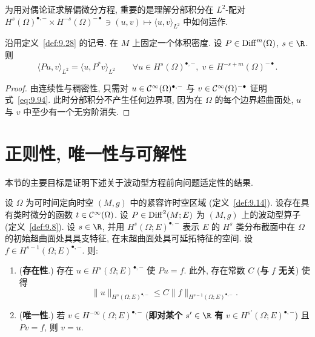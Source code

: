 为用对偶论证求解偏微分方程, 重要的是理解分部积分在 $L^2$-配对 $H^s(\Omega)^{\bullet,-} \times H^{-s}(\Omega)^{-\bullet} \ni (u, v) \mapsto \langle u, v \rangle_{L^2}$ 中如何运作.

\begin{lemma}[分部积分]\label{lem:9.32}
沿用定义~\ref{def:9.28} 的记号. 在 $M$ 上固定一个体积密度. 设 $P \in \operatorname{Diff}^m(\Omega)$, $s \in \R$. 则
\begin{equation}\label{eq:9.94}
    \langle P u, v \rangle_{L^2} = \langle u, P^* v \rangle_{L^2} \qquad \forall u \in H^s(\Omega)^{\bullet,-}, \; v \in H^{-s+m}(\Omega)^{-\bullet}.
\end{equation}
\end{lemma}

\begin{proof}
由连续性与稠密性, 只需对 $u \in \mathcal{C}^\infty(\Omega)^{\bullet,-}$ 与 $v \in \mathcal{C}^\infty(\Omega)^{-\bullet}$ 证明式~\eqref{eq:9.94}. 此时分部积分不产生任何边界项, 因为在 $\Omega$ 的每个边界超曲面处, $u$ 与 $v$ 中至少有一个无穷阶消失.
\end{proof}

\section{正则性, 唯一性与可解性}\label{sec:9.4}
%
%

本节的主要目标是证明下述关于波动型方程前向问题适定性的结果.

\begin{theorem}[求解波动型方程]\label{thm:9.33}
设 $\Omega$ 为可时间定向时空 $(M, g)$ 中的紧容许时空区域 (定义~\ref{def:9.14}). 设存在具有类时微分的函数 $t \in \mathcal{C}^\infty(\Omega)$. 设 $P \in \operatorname{Diff}^2(M; E)$ 为 $(M, g)$ 上的波动型算子 (定义~\ref{def:9.8}). 设 $s \in \R$, 并用 $H^s(\Omega; E)^{\bullet,-}$ 表示 $E$ 的 $H^s$ 类分布截面中在 $\Omega$ 的初始超曲面处具具支特征, 在末超曲面处具可延拓特征的空间. 设 $f \in H^{s-1}(\Omega; E)^{\bullet,-}$. 则:
\begin{enumerate}
    \item (\textbf{存在性}.) 存在 $u \in H^s(\Omega; E)^{\bullet,-}$ 使 $P u = f$. 此外, 存在常数 $C$ (\textbf{与} $f$ \textbf{无关}) 使得
    \begin{equation}\label{eq:9.95}
        \|u\|_{H^s(\Omega; E)^{\bullet,-}} \le C \|f\|_{H^{s-1}(\Omega; E)^{\bullet,-}}.
    \end{equation}
    \item (\textbf{唯一性}.) 若 $v \in H^{-\infty}(\Omega; E)^{\bullet,-}$ (\textbf{即对某个} $s' \in \R$ \textbf{有} $v \in H^{s'}(\Omega; E)^{\bullet,-}$) 且 $P v = f$, 则 $v = u$.
\end{enumerate}
\end{theorem}

